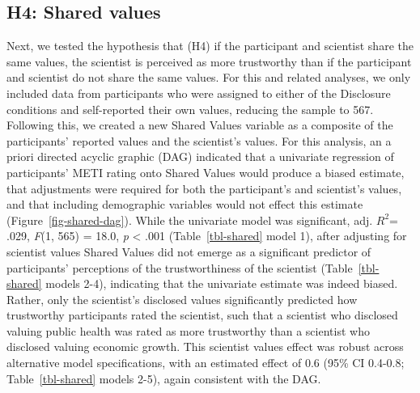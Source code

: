 \documentclass[
  letterpaper,
  DIV=11,
  numbers=noendperiod]{scrartcl}
\begin{document}
\hypertarget{h4-shared-values}{%
\subsection{H4: Shared values}\label{h4-shared-values}}

Next, we tested the hypothesis that (H4) if the participant and
scientist share the same values, the scientist is perceived as more
trustworthy than if the participant and scientist do not share the same
values. For this and related analyses, we only included data from
participants who were assigned to either of the Disclosure conditions
and self-reported their own values, reducing the sample to 567.
Following this, we created a new Shared Values variable as a composite
of the participants' reported values and the scientist's values. For
this analysis, an a priori directed acyclic graphic (DAG) indicated that
a univariate regression of participants' METI rating onto Shared Values
would produce a biased estimate, that adjustments were required for both
the participant's and scientist's values, and that including demographic
variables would not effect this estimate (Figure~\ref{fig-shared-dag}).
While the univariate model was significant, adj. \(R^2\)= .029,
\emph{F}(1, 565) = 18.0, \emph{p} \textless{} .001
(Table~\ref{tbl-shared} model 1), after adjusting for scientist values
Shared Values did not emerge as a significant predictor of participants'
perceptions of the trustworthiness of the scientist
(Table~\ref{tbl-shared} models 2-4), indicating that the univariate
estimate was indeed biased. Rather, only the scientist's disclosed
values significantly predicted how trustworthy participants rated the
scientist, such that a scientist who disclosed valuing public health was
rated as more trustworthy than a scientist who disclosed valuing
economic growth. This scientist values effect was robust across
alternative model specifications, with an estimated effect of 0.6 (95\%
CI 0.4-0.8; Table~\ref{tbl-shared} models 2-5), again consistent with
the DAG.
\end{document}
